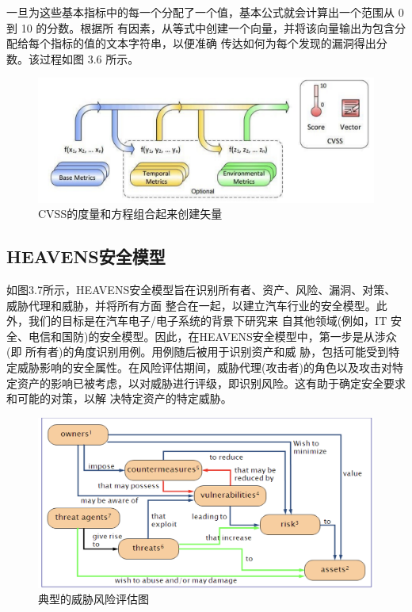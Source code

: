 一旦为这些基本指标中的每一个分配了一个值，基本公式就会计算出一个范围从 0 到 10 的分数。根据所
有因素，从等式中创建一个向量，并将该向量输出为包含分配给每个指标的值的文本字符串，以便准确
传达如何为每个发现的漏洞得出分数。该过程如图 3.6 所示。
\begin{figure}
    \centering
    \includegraphics[scale=0.6]{resources/img/i9.png}
    \caption{CVSS的度量和方程组合起来创建矢量}
  \end{figure}

  \subsection{HEAVENS安全模型}
  如图3.7所示，HEAVENS安全模型旨在识别所有者、资产、风险、漏洞、对策、威胁代理和威胁，并将所有方面
整合在一起，以建立汽车行业的安全模型。此外，我们的目标是在汽车电子/电子系统的背景下研究来
自其他领域(例如，IT 安全、电信和国防)的安全模型。因此，在HEAVENS安全模型中，第一步是从涉众(即
所有者)的角度识别用例。用例随后被用于识别资产和威
胁，包括可能受到特定威胁影响的安全属性。在风险评估期间，威胁代理(攻击者)的角色以及攻击对特
定资产的影响已被考虑，以对威胁进行评级，即识别风险。这有助于确定安全要求和可能的对策，以解
决特定资产的特定威胁。

\begin{figure}
    \centering
    \includegraphics[scale=0.6]{resources/img/i10.png}
    \caption{典型的威胁风险评估图}
  \end{figure}

